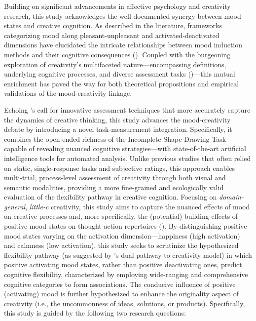 \documentclass[../MA_Thesis.tex]{subfiles}
\begin{document}
Building on significant advancements in affective psychology and creativity research, this study acknowledges the well-documented synergy between mood states and creative cognition. As described in the literature, frameworks categorizing mood along pleasant-unpleasant and activated-deactivated dimensions have elucidated the intricate relationships between mood induction methods and their cognitive consequences (\cite{siedlecka_experimental_2019}). Coupled with the burgeoning exploration of creativity's multifaceted nature---encompassing definitions, underlying cognitive processes, and diverse assessment tasks (\cite{kaufman_cambridge_2010})---this mutual enrichment has paved the way for both theoretical propositions and empirical validations of the mood-creativity linkage.

Echoing \textcite{kaufman_cambridge_2010}’s call for innovative assessment techniques that more accurately capture the dynamics of creative thinking, this study advances the mood-creativity debate by introducing a novel task-measurement integration. Specifically, it combines the open-ended richness of the Incomplete Shape Drawing Task—capable of revealing nuanced cognitive strategies—with state-of-the-art artificial intelligence tools for automated analysis. Unlike previous studies that often relied on static, single-response tasks and subjective ratings, this approach enables multi-trial, process-level assessment of creativity through both visual and semantic modalities, providing a more fine-grained and ecologically valid evaluation of the flexibility pathway in creative cognition. Focusing on \textit{domain-general}, \textit{little-c} creativity, this study aims to capture the nuanced effects of mood on creative processes and, more specifically, the (potential) building effects of positive mood states on thought-action repertoires (\cite{fredrickson_role_2001}). By distinguishing positive mood states varying on the activation dimension---happiness (high activation) and calmness (low activation), this study seeks to scrutinize the hypothesized flexibility pathway (as suggested by \textcite{de_dreu_hedonic_2008}'s dual pathway to creativity model) in which positive activating mood states, rather than positive deactivating ones, predict cognitive flexibility, characterized by employing wide-ranging and comprehensive cognitive categories to form associations. The conducive influence of positive (activating) mood is further hypothesized to enhance the originality aspect of creativity (i.e., the uncommonness of ideas, solutions, or products). Specifically, this study is guided by the following two research questions:  
\end{document}
